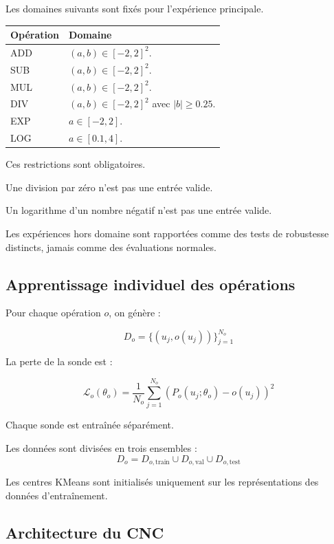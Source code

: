 \documentclass[11pt,a4paper]{article}
\newcommand{\Loss}{\mathcal{L}}
\begin{document}
Les domaines suivants sont fixés pour l'expérience
principale.

\begin{tabularx}{\textwidth}{
    >{\centering\arraybackslash}p{}
    X
}
\toprule
\textbf{Opération} & \textbf{Domaine} \\
\midrule
ADD & $(a,b)\in[-2,2]^2$. \\

SUB & $(a,b)\in[-2,2]^2$. \\

MUL & $(a,b)\in[-2,2]^2$. \\

DIV & $(a,b)\in[-2,2]^2$ avec $|b|\geq0.25$. \\

EXP & $a\in[-2,2]$. \\

LOG & $a\in[0.1,4]$. \\
\bottomrule
\end{tabularx}

Ces restrictions sont obligatoires.

Une division par zéro n'est pas une entrée valide.

Un logarithme d'un nombre négatif n'est pas une entrée valide.

Les expériences hors domaine sont rapportées comme
des tests de robustesse distincts, jamais comme des
évaluations normales.

\subsection{Apprentissage individuel des opérations}

Pour chaque opération $o$, on génère :

\[
D_o=
\{(u_j,o(u_j))\}_{j=1}^{N_o}
\]

La perte de la sonde est :

\[
\Loss_o(\theta_o)
=
\frac{1}{N_o}
\sum_{j=1}^{N_o}
\left(
P_o(u_j;\theta_o)-o(u_j)
\right)^2
\]

Chaque sonde est entraînée séparément.

Les données sont divisées en trois ensembles :
\[
D_o=
D_{o,\mathrm{train}}
\cup D_{o,\mathrm{val}}
\cup D_{o,\mathrm{test}}
\]

Les centres KMeans sont initialisés uniquement
sur les représentations des données d'entraînement.

\subsection{Architecture du CNC}
\end{document}
